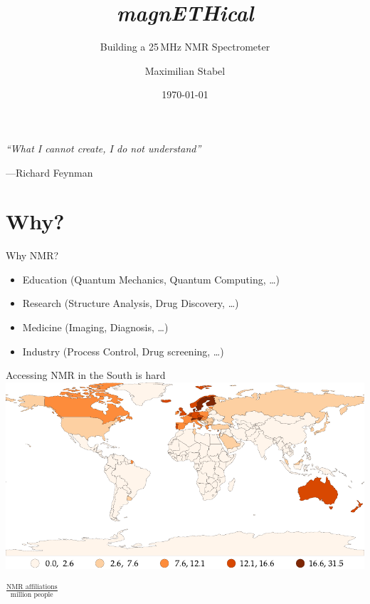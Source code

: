 \documentclass{ethpresentation}
\title{\Huge\textnormal{\textsl{\textmd{\textsl{magn\textbf{ETH}ical}}}}}
\subtitle{Building a 25\,MHz NMR Spectrometer}
\date{\today}
\author{Maximilian Stabel}
\institute{ETH Zürich}
\begin{document}
\maketitle %

\begin{frame}
  \centering
  \emph{\enquote{What I cannot create, I do not understand}}

  \vspace{\baselineskip}

  \hfill{}---Richard Feynman
\end{frame}

\section{Why?}

\begin{frame}{Why NMR?}
  \begin{itemize}[<+->]
    \item Education (Quantum Mechanics, Quantum Computing, \ldots)
    \item Research (Structure Analysis, Drug Discovery, \ldots)
    \item Medicine (Imaging, Diagnosis, \ldots)
    \item Industry (Process Control, Drug screening, \dots)
  \end{itemize}
\end{frame}

\begin{frame}{Accessing NMR in the South is hard}
  \centering
  \includegraphics[height=0.8\textheight]{images/nmr-affiliations-per-million-people_naturalbreaks.pdf}

  \(\frac{\text{NMR affiliations}}{\text{million people}}\)
\end{frame}
\end{document}

